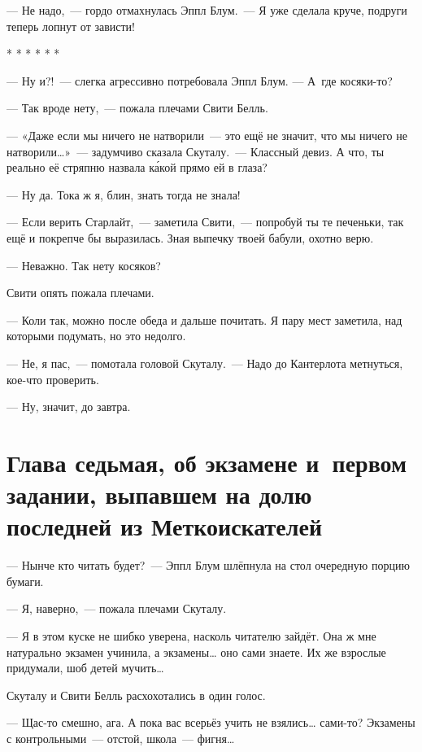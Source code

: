 \documentclass[fontsize=11pt,a5paper,titlepage=firstcover]{scrbook}
\begin{document}
--- Не надо,~--- гордо отмахнулась Эппл Блум.~--- Я уже сделала круче, подруги теперь лопнут от зависти!
\begin{center}* * * * * *\end{center}

--- Ну и?!~--- слегка агрессивно потребовала Эппл Блум. --- А~где косяки-то?

--- Так вроде нету,~--- пожала плечами Свити Белль.

--- «Даже если мы ничего не натворили~--- это ещё не значит, что мы ничего не натворили{\ldots}»~--- задумчиво сказала Скуталу.~--- Классный девиз. А что, ты реально её стряпню назвала ка́кой прямо ей в глаза?

--- Ну да. Тока ж я, блин, знать тогда не знала!

--- Если верить Старлайт,~--- заметила Свити,~--- попробуй ты те печеньки, так ещё и покрепче бы выразилась. Зная выпечку твоей бабули, охотно верю.

--- Неважно. Так нету косяков?

Свити опять пожала плечами.

--- Коли так, можно после обеда и дальше почитать. Я пару мест заметила, над которыми подумать, но это недолго.

--- Не, я пас,~--- помотала головой Скуталу.~--- Надо до Кантерлота метнуться, кое-что проверить.

--- Ну, значит, до завтра.


\chapter*{Глава седьмая, об экзамене и~первом задании, выпавшем на долю последней из Меткоискателей}

--- Нынче кто читать будет?~--- Эппл Блум шлёпнула на стол очередную порцию бумаги.

--- Я, наверно,~--- пожала плечами Скуталу.

--- Я в этом куске не шибко уверена, насколь читателю зайдёт. Она ж мне натурально экзамен учинила, а экзамены{\ldots} оно сами знаете. Их же взрослые придумали, шоб детей мучить{\ldots}

Скуталу и Свити Белль расхохотались в один голос.

--- Щас-то смешно, ага. А пока вас всерьёз учить не взялись{\ldots} сами-то? Экзамены с контрольными~--- отстой, школа~--- фигня{\ldots}
\end{document}
